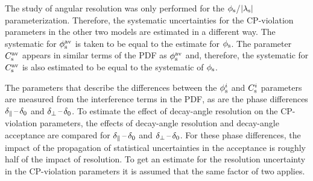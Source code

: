 \begin{description}
The study of angular resolution was only performed for the $\phi_\text{s}$/$|{\lambda_{\text{s}}}|$ parameterization. Therefore, the systematic uncertainties for
the CP-violation parameters in the other two models are estimated in a different way. The systematic for $\phi_\text{s}^{\text{av}}$ is taken to be equal to
the estimate for $\phi_\text{s}$. The parameter $C_\text{s}^\text{av}$ appears in similar terms of the PDF as $\phi_\text{s}^{\text{av}}$ and, therefore, the systematic for $C_\text{s}^\text{av}$
is also estimated to be equal to the systematic of $\phi_\text{s}$.

The parameters that describe the differences between the $\phi_\text{s}^{i}$ and $C_\text{s}^{i}$ parameters are measured from the interference terms in the
PDF, as are the phase differences $\delta_{\parallel}\,\text{--}\,\delta_{0}$ and $\delta_{\perp}\,\text{--}\,\delta_{0}$. To estimate the effect of decay-angle resolution on the CP-violation
parameters, the effects of decay-angle resolution and decay-angle acceptance are compared for $\delta_{\parallel}\,\text{--}\,\delta_{0}$ and $\delta_{\perp}\,\text{--}\,\delta_{0}$. For these
phase differences, the impact of the propagation of statistical uncertainties in the acceptance is roughly half of the impact of
resolution. To get an estimate for the resolution uncertainty in the CP-violation parameters it is assumed that the same factor of two
applies.
\end{description}
